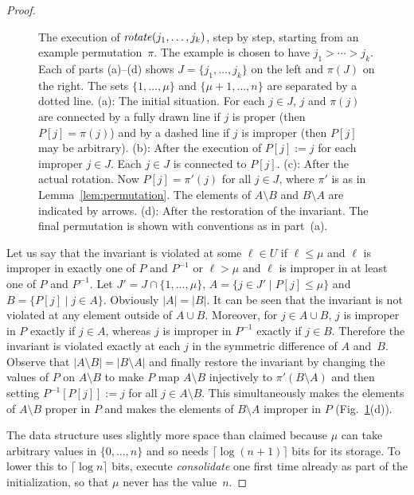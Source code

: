 \documentclass[envcountsame,envcountsect,undated,nolinenumbers]{lnthi}
\def\Tvn#1{\hbox{\textit{#1\/}}}
\def\Tceil#1{\lceil #1\rceil}
\begin{document}
\begin{proof}
\begin{figure}
\begin{center}
\end{center}
\caption{The execution of $\Tvn{rotate}(j_1,\ldots,j_k)$, step
by step, starting from an example permutation~$\pi$.
The example is chosen to have $j_1>\cdots>j_k$.
Each of parts (a)--(d) shows $J=\{j_1,\ldots,j_k\}$ on the left
and $\pi(J)$ on the right.
The sets $\{1,\ldots,\mu\}$ and $\{\mu+1,\ldots,n\}$
are separated by a dotted line.
(a): The initial situation.
For each $j\in J$, $j$ and $\pi(j)$ are connected by a fully
drawn line if $j$ is proper (then $P[j]=\pi(j)$) and by a dashed line if
$j$ is improper (then $P[j]$ may be arbitrary).
(b): After the execution of $P[j]:=j$ for each improper $j\in J$.
Each $j\in J$ is connected to $P[j]$.
(c): After the actual rotation.
Now $P[j]=\pi'(j)$ for all $j\in J$,
where $\pi'$ is as in Lemma~\ref{lem:permutation}.
The elements of $A\setminus B$ and $B\setminus A$
are indicated by arrows.
(d): After the restoration of the invariant.
The final permutation is shown
with conventions as in part~(a).}
\label{fig:rotation}
\end{figure}

Let us say that the invariant is violated
at some $\ell\in U$ if $\ell\le \mu$ and $\ell$ is
improper in exactly one of $P$ and $P^{-1}$ or $\ell>\mu$ and $\ell$ is
improper in at least one of $P$ and $P^{-1}$.
Let $J'=J\cap\{1,\ldots,\mu\}$, 
$A=\{j\in J'\mid P[j]\le \mu\}$ and $B=\{P[j]\mid j\in A\}$.
Obviously $|A|=|B|$.
It can be seen that the invariant is not
violated at any element outside of $A\cup B$.
Moreover, for $j\in A\cup B$, $j$ is improper in $P$
exactly if $j\in A$, whereas $j$ is improper in $P^{-1}$
exactly if $j\in B$.
Therefore the invariant is violated exactly at each $j$
in the symmetric difference of $A$ and~$B$.
Observe that $|A\setminus B|=|B\setminus A|$ and finally
restore the invariant by changing the values of $P$
on $A\setminus B$ to make $P$
map $A\setminus B$ injectively to $\pi'(B\setminus A)$
and then setting $P^{-1}[P[j]]:=j$ for all $j\in A\setminus B$.
This simultaneously makes the elements
of $A\setminus B$ proper in $P$ and makes the elements
of $B\setminus A$ improper in $P$
(Fig.~\ref{fig:rotation}(d)).

The data structure uses slightly
more space than claimed because $\mu$ can take
arbitrary values in $\{0,\ldots,n\}$ and so needs
$\Tceil{\log(n+1)}$ bits for its storage.
To lower this to $\Tceil{\log n}$ bits, execute
\Tvn{consolidate} one first time already as part
of the initialization, so that $\mu$ never has
the value~$n$.
\end{proof}
\end{document}

